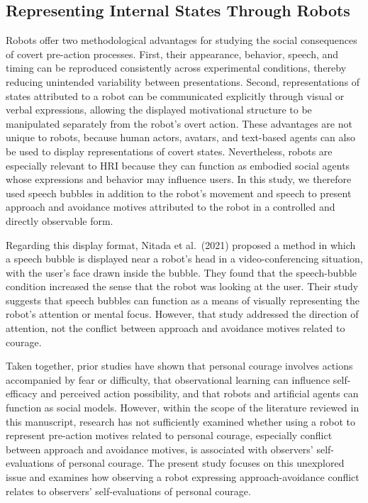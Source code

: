 \documentclass[utf8]{FrontiersinHarvard}
\begin{document}
\subsection{Representing Internal States Through Robots}\label{representing-internal-states-through-robots}

Robots offer two methodological advantages for studying the social consequences of covert pre-action processes. First, their appearance, behavior, speech, and timing can be reproduced consistently across experimental conditions, thereby reducing unintended variability between presentations. Second, representations of states attributed to a robot can be communicated explicitly through visual or verbal expressions, allowing the displayed motivational structure to be manipulated separately from the robot's overt action. These advantages are not unique to robots, because human actors, avatars, and text-based agents can also be used to display representations of covert states. Nevertheless, robots are especially relevant to HRI because they can function as embodied social agents whose expressions and behavior may influence users. In this study, we therefore used speech bubbles in addition to the robot's movement and speech to present approach and avoidance motives attributed to the robot in a controlled and directly observable form.

Regarding this display format, Nitada et al.~(2021) proposed a method in which a speech bubble is displayed near a robot's head in a video-conferencing situation, with the user's face drawn inside the bubble. They found that the speech-bubble condition increased the sense that the robot was looking at the user. Their study suggests that speech bubbles can function as a means of visually representing the robot's attention or mental focus. However, that study addressed the direction of attention, not the conflict between approach and avoidance motives related to courage.

Taken together, prior studies have shown that personal courage involves actions accompanied by fear or difficulty, that observational learning can influence self-efficacy and perceived action possibility, and that robots and artificial agents can function as social models. However, within the scope of the literature reviewed in this manuscript, research has not sufficiently examined whether using a robot to represent pre-action motives related to personal courage, especially conflict between approach and avoidance motives, is associated with observers' self-evaluations of personal courage. The present study focuses on this unexplored issue and examines how observing a robot expressing approach-avoidance conflict relates to observers' self-evaluations of personal courage.
\end{document}

